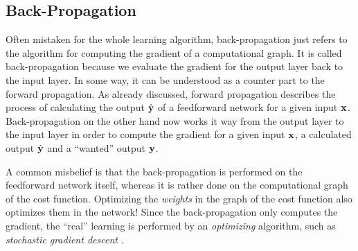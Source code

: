 \subsection{Back-Propagation}
\label{sec:back-propagation}

Often mistaken for the whole learning algorithm, 
back-propagation just refers to the algorithm for computing the gradient of a computational graph.
It is called back-propagation because we evaluate the gradient for the output layer back to the input layer.
In some way, it can be understood as a counter part to the forward propagation.
As already discussed, forward propagation describes the process of calculating the output \(\hat{\mathbf{y}}\) of a feedforward network for a given input \(\mathbf{x}\).
Back-propagation on the other hand now works it way from the output layer to the input layer in order to compute the gradient for a given input \(\mathbf{x}\), a calculated output \(\hat{\mathbf{y}}\) and
a \enquote{wanted} output \(\mathbf{y}\).

A common misbelief is that the back-propagation is performed on the feedforward network itself, whereas it is rather done on the computational graph of the cost function.
Optimizing the \emph{weights} in the graph of the cost function also optimizes them in the network!
Since the back-propagation only computes the gradient, the \enquote{real} learning is performed by an \emph{optimizing} algorithm, such as \emph{stochastic gradient descent} .

